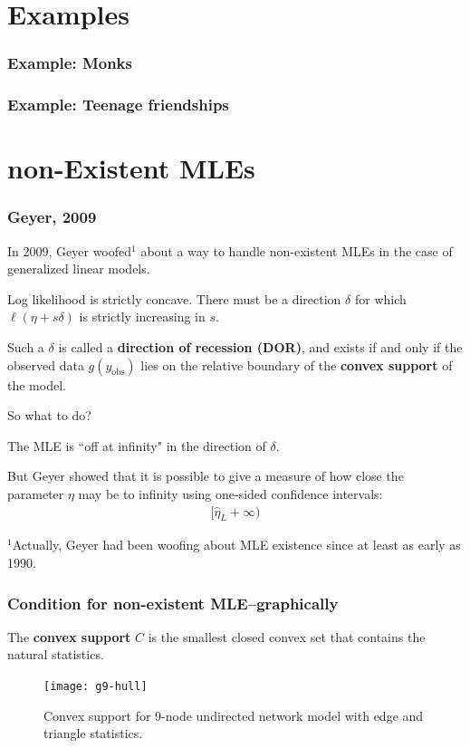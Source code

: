 \documentclass[slidestop,compress, 10pt]{beamer}
\newcommand{\yobs}{y_{\text{obs}}}
\begin{document}
\section{Examples}
\frame
{
  \frametitle{Example: Monks}  
}

\frame
{
  \frametitle{Example: Teenage friendships}  
}







\section{non-Existent MLEs}
\frame
{
  \frametitle{Geyer, 2009}  

In 2009, Geyer woofed$^1$ about a way to handle non-existent MLEs in the case of generalized linear models.
\vspace{2mm}

Log likelihood is strictly concave.  There must be a direction $\delta$ for which
$\ell(\eta + s\delta)$ is strictly increasing in $s$.

Such a $\delta$ is called a \textbf{direction of recession (DOR)}, 
and exists if and only if the
observed data $g(\yobs)$ lies on the relative boundary of the \textbf{convex support} of the model.

So what to do?

The MLE is ``off at infinity" in the direction of $\delta$.

But Geyer showed that it is possible to give a measure of how close the parameter $\eta$ may
be to infinity using one-sided confidence intervals:
\begin{align*}
	[\hat{\eta}_L +\infty)
\end{align*}

\vspace{0.8in}
\footnotesize{$^1$Actually, Geyer had been woofing about MLE existence since at least as early as 1990.}
}

\frame
{
  \frametitle{Condition for non-existent MLE--graphically}  
The \textbf{convex support} $C$ is the smallest closed convex set that contains the natural statistics.

\begin{figure}[h]
\centering
\texttt{[image: g9-hull]}
\caption{Convex support for 9-node undirected network model with edge and triangle
statistics.}
\end{figure}
}
\end{document}
